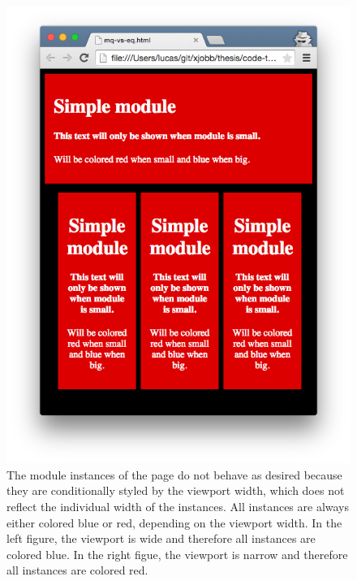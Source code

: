 \documentclass[a4paper,11pt]{kth-mag}
\begin{document}
\begin{figure}[ht]
\begin{minipage}{.5\textwidth}
            \includegraphics[width=\linewidth]{images/mq-small}
          \end{minipage}
          \caption{
            The module instances of the page do not behave as desired because they are conditionally styled by the \gls{viewport} width, which does not reflect the individual width of the instances.
            All instances are always either colored blue or red, depending on the \gls{viewport} width.
            In the left figure, the \gls{viewport} is wide and therefore all instances are colored blue.
            In the right figue, the \gls{viewport} is narrow and therefore all instances are colored red.
          }
          \label{fig:problem-mq}
        \end{figure}
\end{document}
